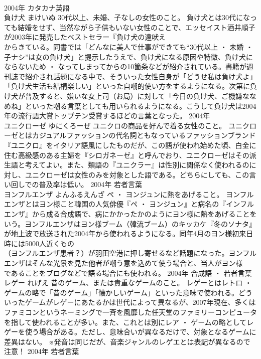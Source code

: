 \documentclass[8pt]{extreport}
\begin{document}
\begin{CJK}{UTF8}{min}
\\	2004年	カタカナ英語	
\\	負け犬	まけいぬ	30代以上、未婚、子なしの女性のこと。	負け犬とは30代になっても結婚をせず、当然ながら子供もいない女性のことで、エッセイスト酒井順子が2003年に発売したベストセラー『負け犬の遠吠え 
\\	からきている。同書では「どんなに美人で仕事ができても“30代以上 ・ 未婚 ・ 子ナシ”は女の負け犬」と提示したうえで、負け犬になる原因や特徴、負け犬にならないため ・ なってしまってからの10箇条などが紹介されている。書籍が週刊誌で紹介され話題になる中で、そういった女性自身が「どうせ私は負け犬よ」「負け犬生活も結構楽しい」といった自嘲的使い方をするようになる。次第に負け犬が普及すると、嫌いな女上司（お局）に対して「今日の負け犬、ご機嫌ななめね」といった嘲る言葉としても用いられるようになる。こうして負け犬は2004年の流行語大賞トップテン受賞するほどの言葉となった。	2004年	
\\	ユニクローゼ	ゆにくろーぜ	ユニクロの商品を好んで着る女性のこと。	ユニクローゼとはカジュアルファッションの代名詞ともなっているファッションブランド『ユニクロ』をイタリア語風にしたものだが、この語が使われ始めた頃、白金に住む高級感のある主婦を『シロガネーゼ』と呼んでおり、ユニクローゼはその派生語と考えてよい。また、類語の『ユニクラー』は性別に関係なく使われるのに対し、ユニクローゼは女性のみを対象とした語である。どちらにしても、この言い回しでの普及率は低い。	2004年	若者言葉	
\\	ヨンフルエンザ	よんふるえんざ	ペ ・ ヨンジュンに熱をあげること。	ヨンフルエンザとはヨン様こと韓国の人気俳優『ペ ・ ヨンジュン』と病名の『インフルエンザ』から成る合成語で、病にかかったかのようにヨン様に熱をあげることをいう。ヨンフルエンザはヨン様ブーム（韓流ブーム）のキッカケ『冬のソナタ』が地上波で放送された2004年から使われるようになる。同年4月のヨン様初来日時には5000人近くもの
\\	（ヨンフルエンザ患者？）が羽田空港に押し寄せるなど話題になった。ヨンフルエンザはそんな光景を見た他者が嘲う意を込めて使う場合と、当人がヨン様
\\	であることをブログなどで語る場合にも使われる。	2004年	合成語 ・ 若者言葉	
\\	レゲー	れげえ	昔のゲーム、または貴重なゲームのこと。	レゲーとはレトロ ・ ゲームの略で「昔のゲーム」「懐かしいゲーム」といった意味で使われる。どういったゲームがレゲーにあたるかは世代によって異なるが、2007年現在、多くはファミコンというネーミングで一斉を風靡した任天堂のファミリーコンピュータを指して使われることが多い。また、これとは別にレア ・ ゲームの略としてレゲーを使う場合がある。ただし、意味合いが異なるだけで、対象となるゲームに差異はない。 ※発音は同じだが、音楽ジャンルのレゲエとは表記が異なるので注意！	2004年	若者言葉	

\end{CJK}
\end{document}

